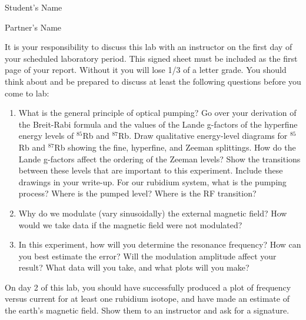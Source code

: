\documentclass{../signatures}
\begin{document}
\hfill
Student's Name \underline{\hspace{3cm}}
\begin{flushright}
Partner's Name \underline{\hspace{3cm}}
\end{flushright}


It is your responsibility to discuss this lab with an instructor on the first day of your scheduled laboratory period. This signed sheet must be included as the first page of your report. Without it you will lose 1/3 of a letter grade. You should think about and be prepared to discuss at least the following questions before you come to lab:
\begin{enumerate}
    \item What is the general principle of optical pumping? Go over your derivation of the Breit-Rabi formula and the values of the Lande g-factors of the hyperfine energy levels of $^{85}$Rb and $^{87}$Rb. Draw qualitative energy-level diagrams for $^{85}$Rb and $^{87}$Rb showing the fine, hyperfine, and Zeeman splittings. How do the Lande g-factors affect the ordering of the Zeeman levels? Show the transitions between these levels that are important to this experiment. Include these drawings in your write-up. For our rubidium system, what is the pumping process? Where is the pumped level? Where is the RF transition?
    \item Why do we modulate (vary sinusoidally) the external magnetic field? How would we take data if the magnetic field were not modulated?
    \item In this experiment, how will you determine the resonance frequency? How can you best estimate the error? Will the modulation amplitude affect your result? What data will you take, and what plots will you make?
\end{enumerate}

\prelabsignature

\vspace{1cm}


On day 2 of this lab, you should have successfully produced a plot of frequency versus current for at least one rubidium isotope, and have made an estimate of the earth’s magnetic field. Show them to an instructor and ask for a signature.\\
\end{document}
